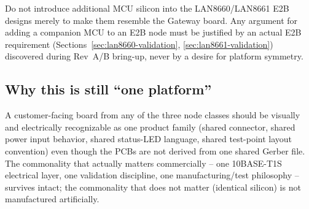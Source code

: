 \begin{decision}[title={Explicit guardrail}]
Do not introduce additional MCU silicon into the LAN8660/LAN8661 E2B designs merely to make them resemble the Gateway board. Any argument for adding a companion MCU to an E2B node must be justified by an actual E2B requirement (Sections~\ref{sec:lan8660-validation}, \ref{sec:lan8661-validation}) discovered during Rev~A/B bring-up, never by a desire for platform symmetry.
\end{decision}

\subsection{Why this is still ``one platform''}

A customer-facing board from any of the three node classes should be visually and electrically recognizable as one product family (shared connector, shared power input behavior, shared status-LED language, shared test-point layout convention) even though the PCBs are not derived from one shared Gerber file. The commonality that actually matters commercially -- one 10BASE-T1S electrical layer, one validation discipline, one manufacturing/test philosophy -- survives intact; the commonality that does not matter (identical silicon) is not manufactured artificially.
